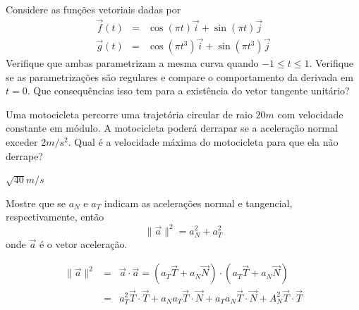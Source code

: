 \begin{exer}
Considere as funções vetoriais dadas por
\begin{eqnarray*}
\vec{f}(t)&=&\cos(\pi t)\vec{i}+\sin(\pi t)\vec{j}\\
\vec{g}(t)&=&\cos(\pi t^3)\vec{i}+\sin(\pi t^3)\vec{j}
\end{eqnarray*}
Verifique que ambas parametrizam a mesma curva quando $-1\leq t \leq 1$. Verifique se as parametrizações são regulares e compare o comportamento da derivada em $t=0$. Que consequências isso tem para a existência do vetor tangente unitário? 
\end{exer}


\begin{exer}Uma motocicleta percorre uma trajetória circular de raio $20m$ com velocidade constante em módulo. A motocicleta poderá derrapar se a aceleração normal exceder $2m/s^2$. Qual é a velocidade máxima do motocicleta para que ela não derrape?
\end{exer}
\begin{resp}
 $\sqrt{40}m/s$
\end{resp}

\begin{exer} Mostre que se $a_N$ e $a_T$ indicam as acelerações normal e tangencial, respectivamente, então
$$\|\vec{a}\|^2=a_N^2+a_T^2$$
onde $\vec{a}$ é o vetor aceleração.
\end{exer}
\begin{resp}
 \begin{eqnarray}
\|\vec{a}\|^2&=&\vec{a}\cdot\vec{a}=\left(a_T\vec{T}+a_N\vec{N}\right)\cdot\left(a_T\vec{T}+a_N\vec{N}\right)\\
&=&a_T^2\vec{T}\cdot\vec{T}+a_Na_T\vec{T}\cdot\vec{N}+a_Ta_N\vec{T}\cdot\vec{N}+A_N^2\vec{T}\cdot\vec{T}  
 \end{eqnarray}
\end{resp}



